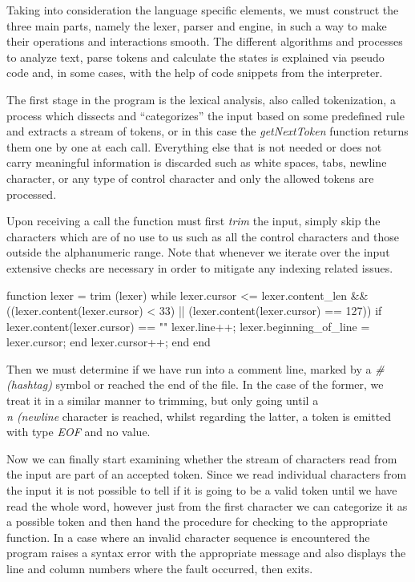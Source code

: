 Taking into consideration the language specific elements, we must construct the three main parts, namely the lexer, parser and engine, in such a way to make their operations and interactions smooth. The different algorithms and processes to analyze text, parse tokens and calculate the states is explained via pseudo code and, in some cases, with the help of code snippets from the interpreter.

The first stage in the program is the lexical analysis, also called tokenization, a process which dissects and ``categorizes'' the input based on some predefined rule and extracts a stream of tokens, or in this case the \textit{getNextToken} function returns them one by one at each call. Everything else that is not needed or does not carry meaningful information is discarded such as white spaces, tabs, newline character, or any type of control character and only the allowed tokens are processed.

Upon receiving a call the function must first \textit{trim} the input, simply skip the characters which are of no use to us such as all the control characters and those outside the alphanumeric range. Note that whenever we iterate over the input extensive checks are necessary in order to mitigate any indexing related issues.

\begin{octave}
function lexer = trim (lexer)
  while lexer.cursor <= lexer.content_len &&
  ((lexer.content(lexer.cursor) < 33) ||
  (lexer.content(lexer.cursor) == 127))
    if lexer.content(lexer.cursor) == "\n"
      lexer.line++;
      lexer.beginning_of_line = lexer.cursor;
    end
    lexer.cursor++;
  end
end
\end{octave}

Then we must determine if we have run into a comment line, marked by a \textit{\# (hashtag)} symbol or reached the end of the file. In the case of the former, we treat it in a similar manner to trimming, but only going until a \textit{\\n (newline} character is reached, whilst regarding the latter, a token is emitted with type \textit{EOF} and no value.

Now we can finally start examining whether the stream of characters read from the input are part of an accepted token. Since we read individual characters from the input it is not possible to tell if it is going to be a valid token until we have read the whole word, however just from the first character we can categorize it as a possible token and then hand the procedure for checking to the appropriate function. In a case where an invalid character sequence is encountered the program raises a syntax error with the appropriate message and also displays the line and column numbers where the fault occurred, then exits.

